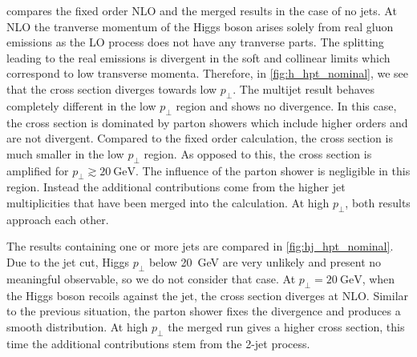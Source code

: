  compares the fixed order NLO and the merged \mcatnlo{} results in the case of no jets.
At NLO the tranverse momentum of the Higgs boson arises solely from real gluon emissions as the LO process does not have any tranverse parts.
The splitting leading to the real emissions is divergent in the soft and collinear limits which correspond to low transverse momenta.
Therefore, in \cref{fig:h_hpt_nominal}, we see that the cross section diverges towards low $p_\perp$.
The multijet result behaves completely different in the low $p_\perp$ region and shows no divergence.
In this case, the cross section is dominated by parton showers which include higher orders and are not divergent.
Compared to the fixed order calculation, the cross section is much smaller in the low $p_\perp$ region.
As opposed to this, the cross section is amplified for $p_\perp \gtrsim \SI{20}{\giga\electronvolt}$.
The influence of the parton shower is negligible in this region.
Instead the additional contributions come from the higher jet multiplicities that have been merged into the calculation.
At high $p_\perp$, both results approach each other.

The results containing one or more jets are compared in \cref{fig:hj_hpt_nominal}.
Due to the jet cut, Higgs $p_\perp$ below \SI{20}{\giga\electronvolt} are very unlikely and present no meaningful observable, so we do not consider that case.
At $p_\perp = \SI{20}{\giga\electronvolt}$, when the Higgs boson recoils against the jet, the cross section diverges at NLO.
Similar to the previous situation, the parton shower fixes the divergence and produces a smooth distribution.
At high $p_\perp$ the merged run gives a higher cross section, this time the additional contributions stem from the 2-jet process.

